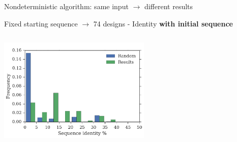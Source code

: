 \documentclass{beamer}
\begin{document}
\begin{frame}[plain]{Nondeterministic algorithm: same input $\rightarrow$ different results}
\centering
\vspace{10px}
\begin{adjustwidth}{-2.5em}{-2.5em}
\hspace{10px}
Fixed starting sequence $\rightarrow$ 74 designs - Identity \textbf{with initial sequence}
\end{adjustwidth}
\hspace{10px}
\includegraphics[width=275px,height=215px]{../img/againstInitial-random.png}
\end{frame}
\end{document}
